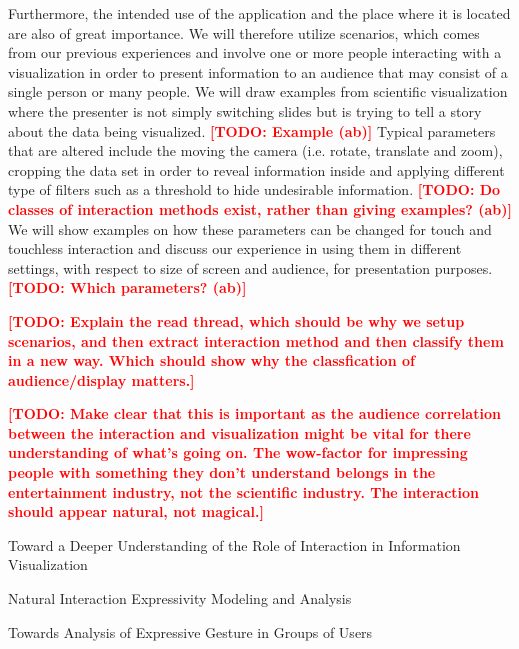 \documentclass[review,journal]{vgtc}         %
\newcommand{\todo}[1]{\textbf{\textcolor{red}{[TODO: {#1}]}}}
\begin{document}
Furthermore, the intended use of the application and the place where it is located are also of great importance. 
We will therefore utilize scenarios, which comes from our previous experiences and involve one or more people interacting with a visualization in order to present information to an audience that may consist of a single person or many people.  
We will draw examples from scientific visualization where the presenter is not simply switching slides but is trying to tell a story about the data being visualized. \todo{Example (ab)}
Typical parameters that are altered include the moving the camera (i.e. rotate, translate and zoom), cropping the data set in order to reveal information inside and applying different type of filters such as a threshold to hide undesirable information. \todo{Do classes of interaction methods exist, rather than giving examples? (ab)}
We will show examples on how these parameters can be changed for touch and touchless interaction and discuss our experience in using them in different settings, with respect to size of screen and audience, for presentation purposes. \todo{Which parameters? (ab)}

\todo{Explain the read thread, which should be why we setup scenarios, and then extract interaction method and then classify them in a new way. Which should show why the classfication of audience/display matters.}

\todo{Make clear that this is important as the audience correlation between the interaction and visualization might be vital for there understanding of what's going on. The wow-factor for impressing people with something they don't understand belongs in the entertainment industry, not the scientific industry. The interaction should appear natural, not magical.}

Toward a Deeper Understanding of the Role of Interaction in Information Visualization \cite{DBLP:journals/tvcg/YiKSJ07}

Natural Interaction Expressivity Modeling and Analysis \cite{Caridakis:2013:NIE:2504335.2504378}

Towards Analysis of Expressive Gesture in Groups of Users \cite{978-3-642-12552-2}

%
\end{document}

